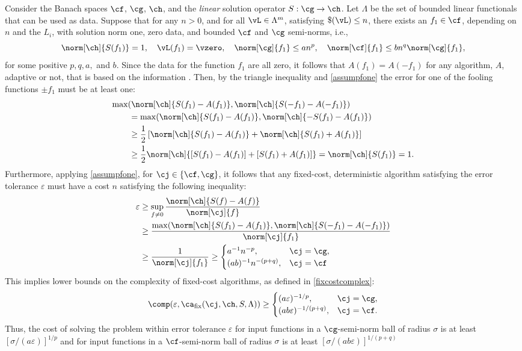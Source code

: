 \documentclass[final]{elsarticle}
\theoremstyle{definition}
\theoremstyle{remark}
\DeclareMathOperator{\fix}{fix}
\begin{document}
Consider the Banach spaces $\cf$, $\cg$, $\ch$, and the \emph{linear} solution operator $S: \cg \to \ch$.  Let $\Lambda$ be the set of bounded linear functionals that can be used as data. Suppose that for any $n>0$, and for all $\vL \in \Lambda^m$, satisfying $\$(\vL)\le n$, there exists an $f_1 \in \cf$, depending on $n$ and the $L_i$, with solution norm one, zero data, and bounded $\cf$ and $\cg$ semi-norms, i.e.,
\begin{equation} \label{assumpfone}
\norm[\ch]{S(f_1)} = 1, \quad \vL(f_1)= \vzero, \quad
\norm[\cg]{f_1} \le a n^{p}, \quad \norm[\cf]{f_1} \le b n^{q} \norm[\cg]{f_1}, 
\end{equation}
for some positive $p, q, a,$ and  $b$.  Since the data for the function $f_1$ are all zero, it follows that $A(f_1)=A(-f_1)$ for any algorithm, $A$, adaptive or not, that is based on the information .  Then, by the triangle inequality and \eqref{assumpfone} the error for one of the fooling functions $\pm f_1$ must be at least one:
\begin{align*}
\MoveEqLeft{\max(\norm[\ch]{S(f_1)-A(f_1)},\norm[\ch]{S(-f_1)-A(-f_1)})} \\
& = \max(\norm[\ch]{S(f_1)-A(f_1)},\norm[\ch]{-S(f_1)-A(f_1)})\\
& \ge \frac{1}{2} \left[ \norm[\ch]{S(f_1)-A(f_1)}+ \norm[\ch]{S(f_1)+A(f_1)} \right] \\
& \ge \frac{1}{2} \norm[\ch]{[S(f_1)-A(f_1)]+[S(f_1)+A(f_1)]} = \norm[\ch]{S(f_1)}=1.
\end{align*}
Furthermore, applying \eqref{assumpfone}, for $\cj \in \{\cf,\cg\}$, it follows that any fixed-cost, deterministic algorithm satisfying the error tolerance $\varepsilon$ must have a cost $n$ satisfying the following inequality:
\begin{align*}
\varepsilon & \ge \sup_{f \ne 0} \frac{\norm[\ch]{S(f)-A(f)}}{\norm[\cj]{f}} \\
& \ge \frac{\max(\norm[\ch]{S(f_1)-A(f_1)},\norm[\ch]{S(-f_1)-A(-f_1)})}{\norm[\cj]{f_1}} \\
& \ge \frac{1}{\norm[\cj]{f_1}} 
\ge \begin{cases} a^{-1} n^{-p}, & \cj=\cg,\\
(ab)^{-1} n^{-(p+q)}, & \cj=\cf
\end{cases}
\end{align*}
This implies lower bounds on the complexity of fixed-cost algorithms, as defined in \eqref{fixcostcomplex}:
\[
\comp(\varepsilon,\ca_{\fix}(\cj,\ch,S,\Lambda)) \ge
\begin{cases} (a\varepsilon)^{-1/p}, & \cj=\cg,\\
(ab\varepsilon)^{-1/(p+q)}, & \cj=\cf.
\end{cases}
\]
Thus, the cost of solving the problem within error tolerance $\varepsilon$ for input functions in a $\cg$-semi-norm ball of radius $\sigma$ is at least $[\sigma/(a\varepsilon)]^{1/p}$ and for input functions in a $\cf$-semi-norm ball of radius $\sigma$ is at least $[\sigma/(ab\varepsilon)]^{1/(p+q)}$
\end{document}
